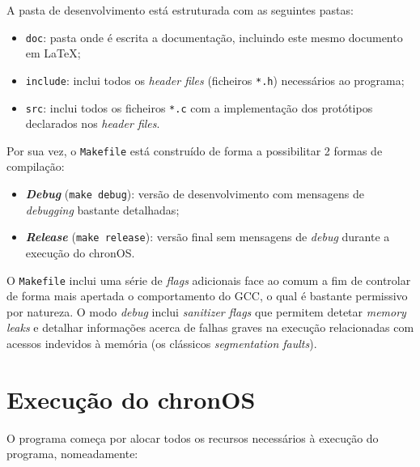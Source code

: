 \documentclass[10pt,oneside]{estiloUBI}
\newcommand{\chronOS}{\textsf{chronOS}}
\begin{document}
	A pasta de desenvolvimento está estruturada com as seguintes pastas:
	
	\begin{itemize}
		\item \verb|doc|: pasta onde é escrita a documentação, incluindo este mesmo documento em \LaTeX;
		\item \verb|include|: inclui todos os \textit{header files} (ficheiros \verb|*.h|) necessários ao programa;
		\item \verb|src|: inclui todos os ficheiros \verb|*.c| com a implementação dos protótipos declarados nos \textit{header files}.
	\end{itemize}
	
	Por sua vez, o \texttt{Makefile} está construído de forma a possibilitar 2 formas de compilação:
	
	\begin{itemize}
		\item \textbf{\textit{Debug}} (\verb|make debug|): versão de desenvolvimento com mensagens de \textit{debugging} bastante detalhadas;
		
		\item \textbf{\textit{Release}} (\verb|make release|): versão final sem mensagens de \textit{debug} durante a execução do \chronOS.
	\end{itemize}

	O \texttt{Makefile} inclui uma série de \textit{flags} adicionais face ao comum a fim de controlar de forma mais apertada o comportamento do \ac{GCC}, o qual é bastante permissivo por natureza. O modo \textit{debug} inclui \textit{sanitizer flags} que permitem detetar \textit{memory leaks} e detalhar informações acerca de falhas graves na execução relacionadas com acessos indevidos à memória (os clássicos \textit{segmentation faults}).
	
	
	\chapter{Execução do \chronOS}
	\label{sec:main}
	
	O programa começa por alocar todos os recursos necessários à execução do programa, nomeadamente:
	
\end{document}

